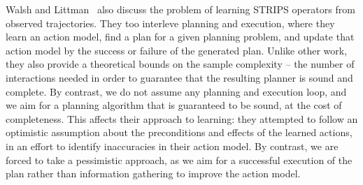 \documentclass[letterpaper]{article}
\begin{document}
Walsh and Littman~ also discuss the problem of learning STRIPS operators from observed trajectories. They too interleve planning and execution, where they learn an action model, find a plan for a given planning problem, and update that action model by the success or failure of the generated plan. Unlike other work, they also provide a theoretical bounds on the sample complexity -- the number of interactions needed in order to guarantee that the resulting planner is sound and complete. By contrast, we do not assume any planning and execution loop, and we aim for a planning algorithm that is guaranteed to be sound, at the cost of completeness. 
This affects their approach to learning: they attempted to follow an optimistic assumption about the preconditions and effects of the learned actions, in an effort to identify inaccuracies in their action model. By contrast, we are forced to take a pessimistic approach, as we aim for a successful execution of the plan rather than information gathering to improve the action model. 




\newpage



\end{document}
